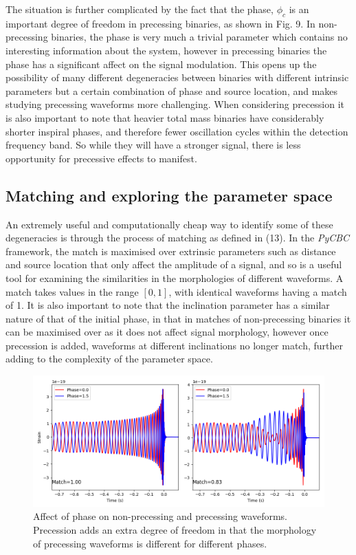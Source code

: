 \documentclass[11pt]{article}
\begin{document}
The situation is further complicated by the fact that the phase, $\phi_c$ is an important degree of freedom in precessing binaries, as shown in Fig. 9. In non-precessing binaries, the phase is very much a trivial parameter which contains no interesting information about the system, however in precessing binaries the phase has a significant affect on the signal modulation. This opens up the possibility of many different degeneracies between binaries with different intrinsic parameters but a certain combination of phase and source location, and makes studying precessing waveforms more challenging. When considering precession it is also important to note that heavier total mass binaries have considerably shorter inspiral phases, and therefore fewer oscillation cycles within the detection frequency band. So while they will have a stronger signal, there is less opportunity for precessive effects to manifest.
\subsection{Matching and exploring the parameter space}
An extremely useful and computationally cheap way to identify some of these degeneracies is through the process of matching as defined in (13). In the \textit{PyCBC} framework, the match is maximised over extrinsic parameters such as distance and source location that only affect the amplitude of a signal, and so is a useful tool for examining the similarities in the morphologies of different waveforms. A match takes values in the range $[0,1]$, with identical waveforms having a match of 1. It is also important to note that the inclination parameter has a similar nature of that of the initial phase, in that in matches of non-precessing binaries it can be maximised over as it does not affect signal morphology, however once precession is added, waveforms at different inclinations no longer match, further adding to the complexity of the parameter space.

\begin{figure}[h]
	\includegraphics[scale=0.58]{fig9.png}
	\centering
	\caption{Affect of phase on non-precessing and precessing waveforms. Precession adds an extra degree of freedom in that the morphology of precessing waveforms is different for different phases.}
	\centering
\end{figure}
\end{document}
